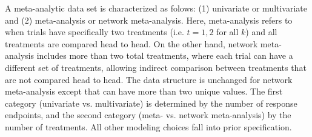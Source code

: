 A meta-analytic data set is characterized as folows: (1) univariate or multivariate and (2) meta-analysis or network meta-analysis. {\color{black}Here, meta-analysis refers to when trials have specifically two treatments (i.e. $t=1,2$ for all $k$) and all treatments are compared head to head. On the other hand, network meta-analysis includes more than two total treatments, where each trial can have a different set of treatments, allowing indirect comparison between treatments that are not compared head to head. The data structure is unchanged for network meta-analysis except that  can have more than two unique values.} The first category {\color{black}(univariate vs. multivariate)} is determined by the number of response endpoints, and the second category {\color{black}(meta- vs. network meta-analysis)} by the number of treatments. All other modeling choices fall into prior specification. 
